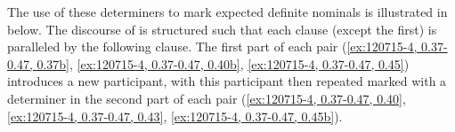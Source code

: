 \begin{multicols}{2}
	\begin{exe}
		\label{ex:au niisk ii}
		\label{ex:hoo niism aan}
	\end{exe}
\end{multicols}
\begin{multicols}{2}
	\begin{exe}
		\label{ex:in niisn ee}
		\label{ex:in niisn aa}
	\end{exe}
\end{multicols}

The use of these determiners to mark expected definite nominals
is illustrated in  below.
The discourse of  is structured such that each clause
(except the first) is paralleled by the following clause.
The first part of each pair (\ref{ex:120715-4, 0.37-0.47, 0.37b},
\ref{ex:120715-4, 0.37-0.47, 0.40b}, \ref{ex:120715-4, 0.37-0.47, 0.45})
introduces a new participant,
with this participant then repeated marked with a determiner
in the second part of each pair (\ref{ex:120715-4, 0.37-0.47, 0.40},
\ref{ex:120715-4, 0.37-0.47, 0.43}, \ref{ex:120715-4, 0.37-0.47, 0.45b}).

